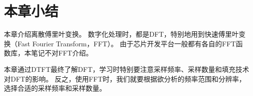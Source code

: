 \section{本章小结}

本章介绍离散傅里叶变换。
数字化处理时，都是DFT，特别地用到快速傅里叶变换（Fast Fourier Transform，FFT）。
由于芯片开发平台一般都有各自的FFT函数库，本笔记不对FFT介绍。

本章通过DTFT最终了解DFT，学习时特别要注意采样频率、采样数量和填充技术对DFT的影响。
反之，使用FFT时，我们就要根据欲分析的频率范围和分辨率，选择合适的采样频率和采样数量。




